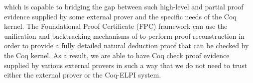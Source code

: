 
which is capable to bridging the
gap between such high-level and partial proof evidence supplied by
some external prover and the specific needs of the Coq kernel.
%
%
The Foundational Proof Certificate (FPC) framework can use
the unification and backtracking mechanisms of \lP to perform proof
reconstruction in order to provide a fully detailed natural deduction
proof that can be checked by the Coq kernel.
%
As a result, we are able to have Coq check proof evidence supplied by
various external provers in such a way that we do not need to trust
either the external prover or the Coq-ELPI system.



